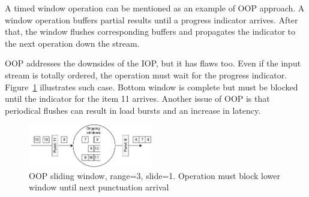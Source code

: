 A timed window operation can be mentioned as an example of OOP approach. A window operation buffers partial results until a progress indicator arrives. After that, the window flushes corresponding buffers and propagates the indicator to the next operation down the stream.

OOP addresses the downsides of the IOP, but it has flaws too. Even if the input stream is totally ordered, the operation must wait for the progress indicator. Figure~\ref{oop} illustrates such case. Bottom window is complete but must be blocked until the indicator for the item 11 arrives. Another issue of OOP is that periodical flushes can result in load bursts and an increase in latency. 

\begin{figure}[htbp]
  \centering
  \includegraphics[width=0.48\textwidth]{pics/oop}
  \caption{OOP sliding window, range=3, slide=1. Operation must block lower window until next punctuation arrival }
  \label {oop}
\end{figure}
